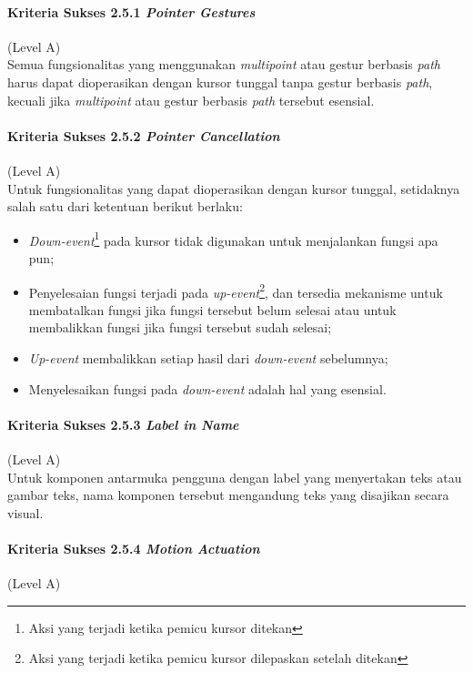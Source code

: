\paragraph{Kriteria Sukses 2.5.1 \textit{Pointer Gestures}}
\label{sec:kriteria_sukses_2.5.1}
(Level A)\\

Semua fungsionalitas yang menggunakan \textit{multipoint} atau gestur berbasis \textit{path} harus dapat dioperasikan dengan kursor tunggal tanpa gestur berbasis \textit{path}, kecuali jika \textit{multipoint} atau gestur berbasis \textit{path} tersebut esensial.

\paragraph{Kriteria Sukses 2.5.2 \textit{Pointer Cancellation}}
\label{sec:kriteria_sukses_2.5.2}
(Level A)\\

Untuk fungsionalitas yang dapat dioperasikan dengan kursor tunggal, setidaknya salah satu dari ketentuan berikut berlaku:
\begin{itemize}
	\item \textit{Down-event}\footnote{Aksi yang terjadi ketika pemicu kursor ditekan} pada kursor tidak digunakan untuk menjalankan fungsi apa pun;
	\item Penyelesaian fungsi terjadi pada \textit{up-event}\footnote{Aksi yang terjadi ketika pemicu kursor dilepaskan setelah ditekan}, dan tersedia mekanisme untuk membatalkan fungsi jika fungsi tersebut belum selesai atau untuk membalikkan fungsi jika fungsi tersebut sudah selesai;
	\item \textit{Up-event} membalikkan setiap hasil dari \textit{down-event} sebelumnya;
	\item Menyelesaikan fungsi pada \textit{down-event} adalah hal yang esensial.
\end{itemize}

\paragraph{Kriteria Sukses 2.5.3 \textit{Label in Name}}
\label{sec:kriteria_sukses_2.5.3}
(Level A)\\

Untuk komponen antarmuka pengguna dengan label yang menyertakan teks atau gambar teks, nama komponen tersebut mengandung teks yang disajikan secara visual. 

\paragraph{Kriteria Sukses 2.5.4 \textit{Motion Actuation}}
\label{sec:kriteria_sukses_2.5.4}
(Level A)\\

